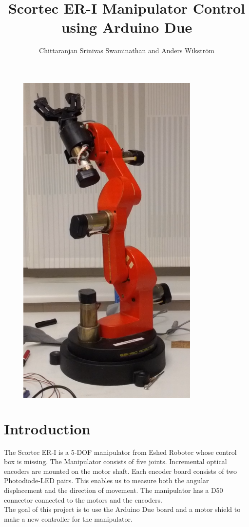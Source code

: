 \documentclass[10pt,a4paper]{article}
\author{Chittaranjan Srinivas Swaminathan and Anders Wikström}
\title{Scortec ER-I Manipulator Control using Arduino Due}
\begin{document}
\maketitle
\begin{figure}[h]
    \centering
    \includegraphics{robotArm.png}
\end{figure}
\newpage
\tableofcontents
\newpage
\section{Introduction}
The Scortec ER-I is a 5-DOF manipulator from Eshed Robotec whose
control box is missing. The Manipulator consists of five
joints. Incremental optical encoders are mounted on the motor
shaft. Each encoder board consists of two Photodiode-LED pairs. This
enables us to measure both the angular displacement and the direction
of movement. The manipulator has a D50 connector connected to the
motors and the encoders.\\

The goal of this project is to use the Arduino
Due board and a motor shield to make a new controller for the
manipulator. 
\end{document}
